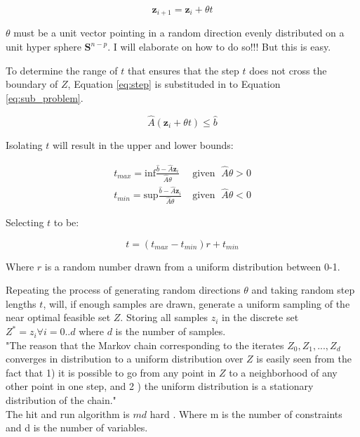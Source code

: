 \documentclass[11pt,a4paper,english]{article}
\begin{document}
\begin{equation}\label{eq:step}
	\mathbf{z}_{i+1} = \mathbf{z}_i + \theta t
\end{equation}

$\theta$ must be a unit vector pointing in a random direction evenly distributed on a unit hyper sphere $\mathbf{S}^{n-p}$. I will elaborate on how to do so!!! But this is easy.

To determine the range of $t$ that ensures that the step $t$ does not cross the boundary of $Z$, Equation \ref{eq:step} is substituded in to Equation \ref{eq:sub_problem}.

\begin{equation}
	\hat{A}(\mathbf{z}_i + \theta t) \leq \hat{b}
\end{equation}

Isolating $t$ will result in the upper and lower bounds:

\begin{align}
t_{max} =  \text{inf} \frac{\hat{b}-\hat{A}\mathbf{z}_i}{\hat{A}\theta}& \; \text{given }  \; \hat{A}\theta>0\\
t_{min} = \text{sup} \frac{\hat{b}-\hat{A}\mathbf{z}_i}{\hat{A}\theta}& \; \text{given }  \; \hat{A}\theta<0
\end{align}

Selecting $t$ to be:

\begin{equation}
	t = (t_{max}-t_{min})r+t_{min}
\end{equation}

Where $r$ is a random number drawn from a uniform distribution between 0-1. 

Repeating the process of generating random directions $\theta$ and taking random step lengths $t$, will, if enough samples are drawn, generate a uniform sampling of the near optimal feasible set $Z$. Storing all samples $z_i$ in the discrete set $Z^* = {z_i \forall i=0..d}$ where $d$ is the number of samples.\\


"The reason that the Markov chain corresponding to the iterates $Z_0,Z_1,...,Z_d$ converges in distribution to a uniform distribution over $Z$ is easily seen from the fact that 1) it is possible to go from any point in $Z$ to a neighborhood of any other point in one step, and 2 ) the uniform distribution is a stationary distribution of the chain." \cite{Smith1996}\\


The hit and run algorithm is $md$ hard \cite{Belisle1998}. Where m is the number of constraints and d is the number of variables. 
\end{document}
